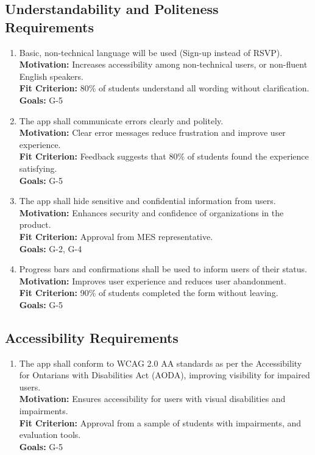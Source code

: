 \documentclass[12pt]{article}
\begin{document}
\subsection{Understandability and Politeness Requirements}
\begin{enumerate}[label=\bfseries UR-\arabic*:, wide=0pt, leftmargin=*,,ref=\bfseries UR-\arabic*]
  \item \label{UR1} Basic, non-technical language will be used (Sign-up instead of RSVP).\\[2mm]
    {\bf Motivation:} Increases accessibility among non-technical users, or non-fluent English speakers.\\
    {\bf Fit Criterion:} 80\% of students understand all wording without clarification.\\
    {\bf Goals:} G-5
  \item \label{UR2} The app shall communicate errors clearly and politely.\\[2mm]
    {\bf Motivation:} Clear error messages reduce frustration and improve user experience.\\
    {\bf Fit Criterion:} Feedback suggests that 80\% of students found the experience satisfying.\\
    {\bf Goals:} G-5
  \item \label{UR3} The app shall hide sensitive and confidential information from users.\\[2mm]
    {\bf Motivation:} Enhances security and confidence of organizations in the product.\\
    {\bf Fit Criterion:} Approval from MES representative.\\
    {\bf Goals:} G-2, G-4
  \item Progress bars and confirmations shall be used to inform users of their status.\\[2mm]
    {\bf Motivation:} Improves user experience and reduces user abandonment.\\
    {\bf Fit Criterion:} 90\% of students completed the form without leaving.\\
    {\bf Goals:} G-5
\end{enumerate}

\subsection{Accessibility Requirements}
\begin{enumerate}[label=\bfseries AC-\arabic*:, wide=0pt, leftmargin=*,ref=\bfseries AC-\arabic*]
  \item \label{AC1} The app shall conform to WCAG 2.0 AA standards as per the Accessibility for Ontarians with Disabilities Act (AODA), improving visibility for impaired users.\\[2mm]
    {\bf Motivation:} Ensures accessibility for users with visual disabilities and impairments.\\
    {\bf Fit Criterion:} Approval from a sample of students with impairments, and evaluation tools.\\
    {\bf Goals:} G-5
\end{enumerate}
\end{document}
